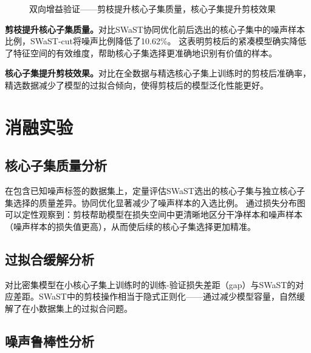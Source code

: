 \begin{figure}[htb]
  \centering
  \caption{双向增益验证——剪枝提升核心子集质量，核心子集提升剪枝效果}
  \label{fig:swast-bidirectional}
\end{figure}

\textbf{剪枝提升核心子集质量。}对比SWaST协同优化前后选出的核心子集中的噪声样本比例，SWaST-cut将噪声比例降低了10.62\%。%
这表明剪枝后的紧凑模型确实降低了特征空间的有效维度，帮助核心子集选择更准确地识别有价值的样本。

\textbf{核心子集提升剪枝效果。}对比在全数据与精选核心子集上训练时的剪枝后准确率，精选数据减少了模型的过拟合倾向，使得剪枝后的模型泛化性能更好。


\section{消融实验}

\subsection{核心子集质量分析}

在包含已知噪声标签的数据集上，定量评估SWaST选出的核心子集与独立核心子集选择的质量差异。协同优化显著减少了噪声样本的入选比例。%
通过损失分布图可以定性观察到：剪枝帮助模型在损失空间中更清晰地区分干净样本和噪声样本（噪声样本的损失值更高），从而使后续的核心子集选择更加精准。

\subsection{过拟合缓解分析}

对比密集模型在小核心子集上训练时的训练-验证损失差距（gap）与SWaST的对应差距。SWaST中的剪枝操作相当于隐式正则化\cite{hoefler2021sparsity}——通过减少模型容量，自然缓解了在小数据集上的过拟合问题。%

\subsection{噪声鲁棒性分析}

